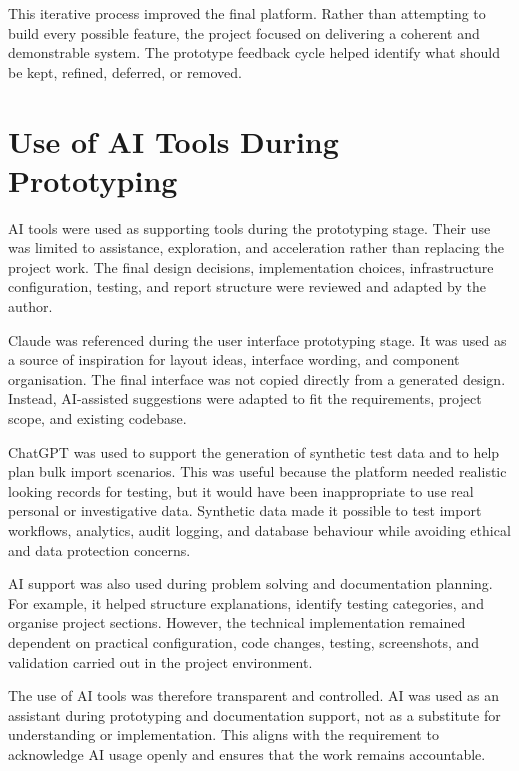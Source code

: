 This iterative process improved the final platform. Rather than attempting to build every possible feature, the project focused on delivering a coherent and demonstrable system. The prototype feedback cycle helped identify what should be kept, refined, deferred, or removed.



\section{Use of AI Tools During Prototyping}

AI tools were used as supporting tools during the prototyping stage. Their use was limited to assistance, exploration, and acceleration rather than replacing the project work. The final design decisions, implementation choices, infrastructure configuration, testing, and report structure were reviewed and adapted by the author.

Claude was referenced during the user interface prototyping stage. It was used as a source of inspiration for layout ideas, interface wording, and component organisation. The final interface was not copied directly from a generated design. Instead, AI-assisted suggestions were adapted to fit the requirements, project scope, and existing codebase.

ChatGPT was used to support the generation of synthetic test data and to help plan bulk import scenarios. This was useful because the platform needed realistic looking records for testing, but it would have been inappropriate to use real personal or investigative data. Synthetic data made it possible to test import workflows, analytics, audit logging, and database behaviour while avoiding ethical and data protection concerns.

AI support was also used during problem solving and documentation planning. For example, it helped structure explanations, identify testing categories, and organise project sections. However, the technical implementation remained dependent on practical configuration, code changes, testing, screenshots, and validation carried out in the project environment.

The use of AI tools was therefore transparent and controlled. AI was used as an assistant during prototyping and documentation support, not as a substitute for understanding or implementation. This aligns with the requirement to acknowledge AI usage openly and ensures that the work remains accountable.

